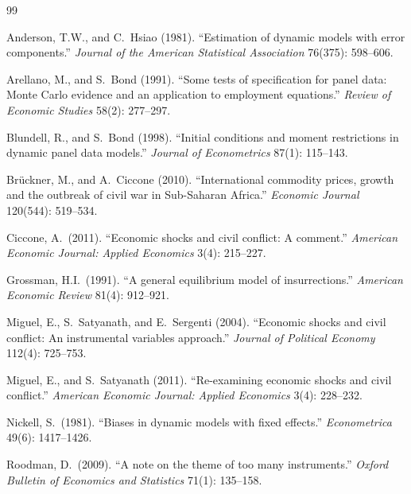\documentclass[11pt,a4paper]{article}
\begin{document}
\renewcommand{\refname}{References}
\begin{thebibliography}{99}\small

Anderson, T.W., and C.\ Hsiao (1981). ``Estimation of dynamic models
  with error components.'' \emph{Journal of the American Statistical
  Association} 76(375): 598--606.

Arellano, M., and S.\ Bond (1991). ``Some tests of specification for
  panel data: Monte Carlo evidence and an application to employment
  equations.'' \emph{Review of Economic Studies} 58(2): 277--297.

Blundell, R., and S.\ Bond (1998). ``Initial conditions and moment
  restrictions in dynamic panel data models.''
  \emph{Journal of Econometrics} 87(1): 115--143.

Br\"uckner, M., and A.\ Ciccone (2010). ``International commodity
  prices, growth and the outbreak of civil war in Sub-Saharan Africa.''
  \emph{Economic Journal} 120(544): 519--534.

Ciccone, A.\ (2011). ``Economic shocks and civil conflict: A
  comment.'' \emph{American Economic Journal: Applied Economics}
  3(4): 215--227.

Grossman, H.I.\ (1991). ``A general equilibrium model of
  insurrections.'' \emph{American Economic Review} 81(4): 912--921.

Miguel, E., S.\ Satyanath, and E.\ Sergenti (2004). ``Economic
  shocks and civil conflict: An instrumental variables approach.''
  \emph{Journal of Political Economy} 112(4): 725--753.

Miguel, E., and S.\ Satyanath (2011). ``Re-examining economic shocks
  and civil conflict.'' \emph{American Economic Journal: Applied
  Economics} 3(4): 228--232.

Nickell, S.\ (1981). ``Biases in dynamic models with fixed effects.''
  \emph{Econometrica} 49(6): 1417--1426.

Roodman, D.\ (2009). ``A note on the theme of too many instruments.''
  \emph{Oxford Bulletin of Economics and Statistics} 71(1): 135--158.


\end{thebibliography}
\end{document}
